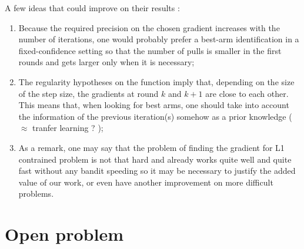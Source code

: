 \documentclass[english]{article}
\begin{document}
A few ideas that could improve on their results :
\begin{enumerate}
\item Because the required precision on the chosen gradient increases with the number of iterations, one would probably prefer a best-arm identification in a fixed-confidence setting so that the number of pulls is smaller in the first rounds and gets larger only when it is necessary;
\item The regularity hypotheses on the function imply that, depending on the size of the step size, the gradients at round $k$ and $k+1$ are close to each other. This means that, when looking for best arms, one should take into account the information of the previous iteration(s) somehow as a prior knowledge ($\approx$  tranfer learning ? );
\item As a remark, one may say that the problem of finding the gradient for L1 contrained problem is not that hard and already works quite well and quite fast without any bandit speeding so it may be necessary to justify the added value of our work, or even have another improvement on more difficult problems.
\end{enumerate}

\section{Open problem}


 
\end{document}
